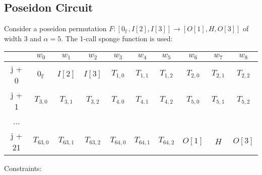 \subsection{Poseidon Circuit}
\label{section:poseidon}
Consider a poseidon permutation $F: [0_{\mathbb{F}}, I[2], I[3]] \rightarrow [O[1], H, O[3]]$ of width $3$ and $\alpha = 5$.
The 1-call sponge function is used:
\begin{center}
    \begin{tabular}{ c|c|c|c|c|c|c|c|c|c }
        & $w_0$  & $w_1$  & $w_2$  & $w_3$  & $w_4$  & $w_5$ & $w_6$ & $w_7$ & $w_8$  \\
        \hline
        j + 0  & $0_{\mathbb{F}}$ & $I[2]$ & $I[3]$ & $T_{1,0}$ & $T_{1,1}$ & $T_{1,2}$ & $T_{2,0}$ & $T_{2,1}$ & $T_{2,2}$ \\
        j + 1   & $T_{3,0}$ & $T_{3,1}$ & $T_{3,2}$ & $T_{4,0}$ & $T_{4,1}$ & $T_{4,2}$ & $T_{5,0}$ & $T_{5,1}$ & $T_{5,2}$\\
        ...    &                  &           &           &           &           \\
        j + 21 & $T_{63,0}$ & $T_{63,1}$ & $T_{63,2}$ & $T_{64,0}$ & $T_{64,1}$ & $T_{64,2}$ & $O[1]$ & $H$ & $O[3]$ \\
    \end{tabular}
\end{center}
Constraints:
